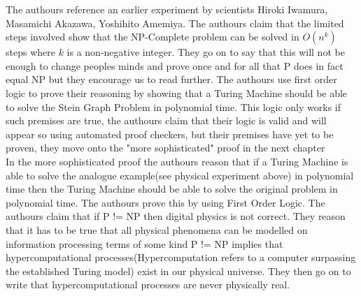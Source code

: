 \documentclass{report}
\begin{document}
The authours reference an earlier experiment by scientists Hiroki Iwamura, Masamichi Akazawa, Yoshihito Amemiya\cite{Iwamura}.  The authours claim that the limited steps involved show that the NP-Complete problem can be solved in $O(n^k)$ steps where $k$ is a non-negative integer.  They go on to say that this will not be enough to change peoples minds and prove once and for all that P does in fact equal NP but they encourage us to read further.  The authours use first order logic to prove their reasoning by showing that a Turing Machine should be able to solve the Stein Graph Problem\cite{Steiner} in polynomial time.  This logic only works if such premises are true, the authours claim that their logic is valid and will appear so using automated proof checkers, but their premises have yet to be proven, they move onto the "more sophisticated" proof in the next chapter\cite{PVsNPSolved}
\\
In the more sophisticated proof the authours reason that if a Turing Machine is able to solve the analogue example(see physical experiment above) in polynomial time then the Turing Machine should be able to solve the original problem in polynomial time.  The authours prove this by using First Order Logic\cite{Logic}.  The authours claim that if P != NP then digital physics\cite{Zuse} is not correct.  They reason that it has to be true that all physical phenomena can be modelled on information processing terms of some kind P != NP implies that hypercomputational processes(Hypercomputation refers to a computer surpassing the established Turing model)\cite{Wells_2004} exist in our physical universe.  They then go on to write that hypercomputational processes are never physically real.
\end{document}
